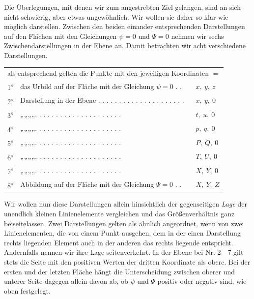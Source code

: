 Die Überlegungen, mit denen wir zum angestrebten Ziel gelangen, sind an sich nicht schwierig, aber etwas ungewöhnlich. Wir wollen sie daher so klar wie möglich darstellen. Zwischen den beiden einander entsprechenden Darstellungen auf den Flächen mit den Gleichungen \(\psi=0\) und \(\Psi=0\) nehmen wir sechs Zwischendarstellungen in der Ebene an. Damit betrachten wir acht verschiedene Darstellungen.
\begin{center}
\begingroup\fontsize{8}{10}\selectfont\setlength{\tabcolsep}{2pt}
\begin{tabular}{@{}lll@{}}
\multicolumn{3}{r}{\parbox{1.55in}{\raggedright als entsprechend gelten die Punkte mit den jeweiligen Koordinaten \(=\)}}\\[2pt]
1\textsuperscript{s}&das Urbild auf der Fläche mit der Gleichung \(\psi=0\) . .&\(x,\ y,\ z\)\\
2\textsuperscript{s}&Darstellung in der Ebene . . . . . . . . . . . . . . . . . . . . .&\(x,\ y,\ 0\)\\
3\textsuperscript{s}&\quad „\quad „\quad „\quad „\quad . . . . . . . . . . . . . . . . . . . . .&\(t,\ u,\ 0\)\\
4\textsuperscript{s}&\quad „\quad „\quad „\quad „\quad . . . . . . . . . . . . . . . . . . . . .&\(p,\ q,\ 0\)\\
5\textsuperscript{s}&\quad „\quad „\quad „\quad „\quad . . . . . . . . . . . . . . . . . . . . .&\(P,\ Q,\ 0\)\\
6\textsuperscript{s}&\quad „\quad „\quad „\quad „\quad . . . . . . . . . . . . . . . . . . . . .&\(T,\ U,\ 0\)\\
7\textsuperscript{s}&\quad „\quad „\quad „\quad „\quad . . . . . . . . . . . . . . . . . . . . .&\(X,\ Y,\ 0\)\\
8\textsuperscript{s}&Abbildung auf der Fläche mit der Gleichung \(\Psi=0\) . .&\(X,\ Y,\ Z\)
\end{tabular}\endgroup
\end{center}
\par\indent Wir wollen nun diese Darstellungen allein hinsichtlich der gegenseitigen \textit{Lage} der unendlich kleinen Linienelemente vergleichen %
%
und das Größenverhältnis ganz beiseitelassen. Zwei Darstellungen gelten als ähnlich angeordnet, wenn von zwei Linienelementen, die von einem Punkt ausgehen, dem in der einen Darstellung rechts liegenden Element auch in der anderen das rechts liegende entspricht. Andernfalls nennen wir ihre Lage seitenverkehrt. In der Ebene bei Nr. 2---7 gilt stets die Seite mit den positiven Werten der dritten Koordinate als obere. Bei der ersten und der letzten Fläche hängt die Unterscheidung zwischen oberer und unterer Seite dagegen allein davon ab, ob \(\psi\) und \(\Psi\) positiv oder negativ sind, wie oben festgelegt.

